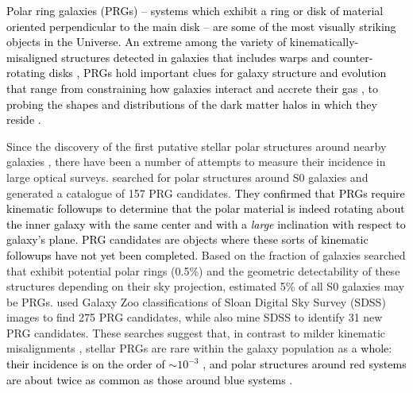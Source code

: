 \documentclass[fleqn,usenatbib]{mnras}
\newcommand{\KS}[1]{\textcolor{black}{#1}}
\begin{document}
\textcolor{black}{Polar ring galaxies (PRGs) -- systems which exhibit a ring or disk of material oriented perpendicular to the main disk -- are some of the most visually striking objects in the Universe. An extreme among the variety of kinematically-misaligned structures detected in galaxies that includes warps and counter-rotating disks \citep{Serra2014}, PRGs hold important clues for galaxy structure and evolution that range from constraining how galaxies interact \citep[e.g.\ ][]{Bekki1997, Bournaud2003,Reshetnikov1997} and accrete their gas \citep[e.g.\ ][]{Maccio2006,Brook2008, Khoperskov2021}, to probing the shapes and distributions of the dark matter halos in which they reside \citep[e.g.\ ][]{Sackett1990,Combes1996,Khoperskov2014}.}



Since the discovery of the first putative stellar polar structures around nearby galaxies \citep{Sandage1961,Schecter1978}, there have been a number of attempts to measure their incidence in large optical surveys. \citet{Whitmore1990} searched for polar structures around S0 galaxies and generated a catalogue of 157 PRG candidates. \textcolor{black}{They confirmed that PRGs require kinematic followups to determine that the polar material is indeed rotating about the inner galaxy with the same center and with a \textit{large} inclination with respect to galaxy's plane.  PRG candidates are objects where these sorts of kinematic followups have not yet been completed.}  Based on the fraction of galaxies searched that exhibit potential polar rings (0.5\%) and the geometric detectability of these structures depending on their sky projection, \citet{Whitmore1990} estimated 5\% of all S0 galaxies may be PRGs.  \citet{Moiseev2011} used Galaxy Zoo  \citep{Lintott2008} classifications of Sloan Digital Sky Survey (SDSS) images to find 275 PRG candidates, while \citet{Reshetnikov2019} also mine SDSS to identify 31 new PRG candidates. These searches suggest that, in contrast to milder kinematic misalignments \citep[e.g.\ ][]{GarciaRuiz2002,Ann2006,Ristea2022}, stellar PRGs are rare within the galaxy population as a \KS{whole: their incidence is on the order of $\sim10^{-3}$ \citep{Reshetnikov2011}, and polar structures around red systems are about twice as common as those around blue systems \citep{Smirnov2022}.} 
\end{document}
